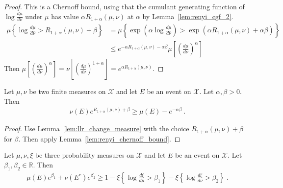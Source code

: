 \begin{proof}\leanok
{}
This is a Chernoff bound, using that the cumulant generating function of $\log\frac{d\mu}{d\nu}$ under $\mu$ has value $\alpha R_{1+\alpha}(\mu, \nu)$ at $\alpha$ by Lemma~\ref{lem:renyi_cgf_2}.
\begin{align*}
\mu\left\{ \log\frac{d \mu}{d \nu} > R_{1+\alpha}(\mu, \nu) + \beta \right\}
&= \mu\left\{ \exp\left(\alpha\log\frac{d \mu}{d \nu}\right) > \exp\left(\alpha R_{1+\alpha}(\mu, \nu) + \alpha \beta\right) \right\}
\\
&\le e^{-\alpha R_{1+\alpha}(\mu, \nu) - \alpha \beta} \mu\left[\left(\frac{d \mu}{d \nu}\right)^\alpha \right]
\end{align*}
Then $\mu\left[\left(\frac{d \mu}{d \nu}\right)^\alpha \right] = \nu\left[\left(\frac{d \mu}{d \nu}\right)^{1+\alpha} \right] = e^{\alpha R_{1+\alpha}(\mu, \nu)}$.
\end{proof}

\begin{lemma}
  \label{lem:renyi_change_measure}
  \leanok
  Let $\mu, \nu$ be two finite measures on $\mathcal X$ and let $E$ be an event on $\mathcal X$. Let $\alpha,\beta > 0$. Then
  \begin{align*}
  \nu(E) e^{R_{1+\alpha}(\mu, \nu) + \beta} \ge \mu(E) - e^{-\alpha \beta} \: .
  \end{align*}
\end{lemma}

\begin{proof}\leanok
{}
Use Lemma~\ref{lem:llr_change_measure} with the choice $R_{1+\alpha}(\mu, \nu) + \beta$ for $\beta$. Then apply Lemma~\ref{lem:renyi_chernoff_bound}.
\end{proof}

\begin{lemma}
  \label{lem:llr_change_measure_add}
  \leanok
  Let $\mu, \nu, \xi$ be three probability measures on $\mathcal X$ and let $E$ be an event on $\mathcal X$. Let $\beta_1, \beta_2 \in \mathbb{R}$. Then
  \begin{align*}
  \mu(E) e^{\beta_1} + \nu(E^c) e^{\beta_2} \ge 1 - \xi\left\{ \log\frac{d \xi}{d \mu} > \beta_1 \right\} - \xi\left\{ \log\frac{d \xi}{d \nu} > \beta_2 \right\} \: .
  \end{align*}
\end{lemma}

